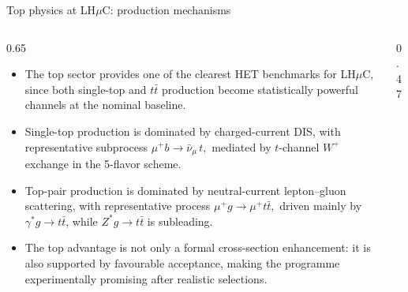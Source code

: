 \documentclass[aspectratio=1610,english]{beamer}
\newcommand{\LHCmu}{LH$\mu$C}
\begin{document}
\begin{frame}{Top physics at \LHCmu{}: production mechanisms}

\begin{columns}[T]%


\begin{column}{0.65\textwidth}
\small
\begin{itemize} \itemsep 0.45em
\justifying

\item The top sector provides one of the clearest HET benchmarks for \LHCmu{}, since both single-top and \(t\bar t\) production become statistically powerful channels at the nominal baseline.

\item {\color{magenta}Single-top production} is dominated by charged-current DIS, with representative subprocess $\mu^{+} b \to \bar{\nu}_{\mu}\, t ,$ 
mediated by \(t\)-channel \(W^{+}\) exchange in the 5-flavor scheme.

\item {\color{magenta}Top-pair production} is dominated by neutral-current lepton--gluon scattering, with representative process $\mu^{+} g \to \mu^{+} t\bar t ,$
driven mainly by \(\gamma^\ast g \to t\bar t\), while \(Z^\ast g \to t\bar t\) is subleading.

\item The top advantage is not only a formal cross-section enhancement: it is also supported by favourable acceptance, making the programme experimentally promising after realistic selections.

\end{itemize}
\end{column}


\vspace{-0.5em}
\begin{column}{0.47\textwidth}
\vspace{-0.5em}

\centering

\begin{minipage}{\linewidth}
\centering
\begin{center}
	\setlength{\fboxsep}{3pt}
\end{center}
\vspace{-0.25em}


\end{minipage}
\end{column}
\end{columns}
\end{frame}
\end{document}
